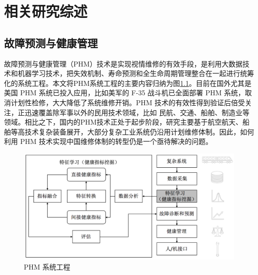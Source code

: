 \chapter{相关研究综述}
\label{cha:review}

\section{故障预测与健康管理}
\label{sec:review-phm}

故障预测与健康管理（PHM）技术是实现视情维修的有效手段，是利用大数据技术和机器学习技术，把失效机制、寿命预测和全生命周期管理整合在一起进行统筹化的系统工程\cite{lee2014prognostics}。本文将PHM系统工程的主要内容归纳为图\ref{fig:phm-framework}。目前在国外尤其是美国 PHM 系统已投入应用，比如美军的 F-35 战斗机已全面部署 PHM 系统，取消计划性检修，大大降低了系统维修开销\cite{brown2007prognostics}。PHM 技术的有效性得到验证后倍受关注，正迅速覆盖除军事以外的民用技术领域，比如 民航、交通、船舶、制造业等领域。相比之下，国内的PHM技术正处于起步阶段，研究主要基于航空航天、船舶等高技术复杂装备展开\cite{彭宇2010故障预测与健康管理技术综述}，大部分复杂工业系统仍沿用计划维修体制。因此，如何利用 PHM 技术实现中国维修体制的转型仍是一个亟待解决的问题。
\begin{figure}[H]
\centering
\includegraphics[scale=0.5]{figures/phm-framework.png}
\caption{PHM 系统工程}
\label{fig:phm-framework}
\end{figure}
